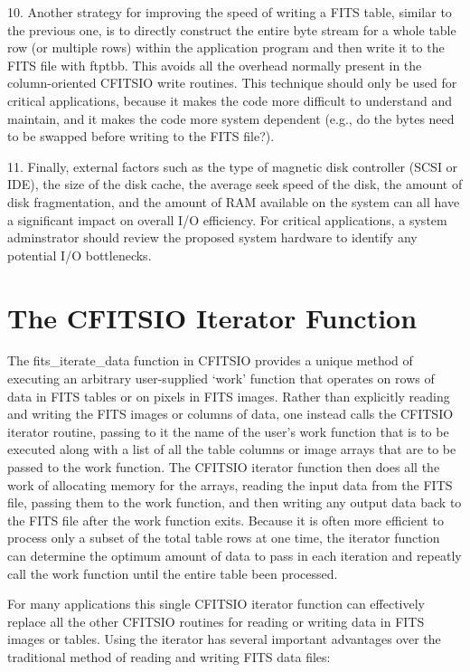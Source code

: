 \documentclass[11pt]{book}
\begin{document}
10. Another strategy for improving the speed of writing a FITS table,
similar to the previous one, is to directly construct the entire byte
stream for a whole table row (or multiple rows) within the application
program and then write it to the FITS file with
ftptbb.  This avoids all the overhead normally present
in the column-oriented CFITSIO write routines.  This technique should
only be used for critical applications, because it makes the code more
difficult to understand and maintain, and it makes the code more system
dependent (e.g., do the bytes need to be swapped before writing to the
FITS file?).

11.  Finally, external factors such as the type of magnetic disk
controller (SCSI or IDE), the size of the disk cache, the average seek
speed of the disk, the amount of disk fragmentation, and the amount of
RAM available on the system can all have a significant impact on
overall I/O efficiency.  For critical applications, a system
adminstrator should review the proposed system hardware to identify any
potential I/O bottlenecks.


\chapter{ The CFITSIO Iterator Function }

The fits\_iterate\_data function in CFITSIO provides a unique method of
executing an arbitrary user-supplied `work' function that operates on
rows of data in  FITS tables or on pixels in FITS images.  Rather than
explicitly reading and writing the FITS images or columns of data, one
instead calls the CFITSIO iterator routine, passing to it the name of
the user's work function that is to be executed along with a list of
all the table columns or image arrays that are to be passed to the work
function.  The CFITSIO iterator function then does all the work of
allocating memory for the arrays, reading the input data from the FITS
file, passing them to the work function, and then writing any output
data back to the FITS file after the work function exits.  Because
it is often more efficient to process only a subset of the total table
rows at one time, the iterator function can determine the optimum
amount of data to pass in each iteration and repeatly call the work
function until the entire table been processed.

For many applications this single CFITSIO iterator function can
effectively replace all the other CFITSIO routines for reading or
writing data in FITS images or tables.  Using the iterator has several
important advantages over the traditional method of reading and writing
FITS data files:
\end{document}
